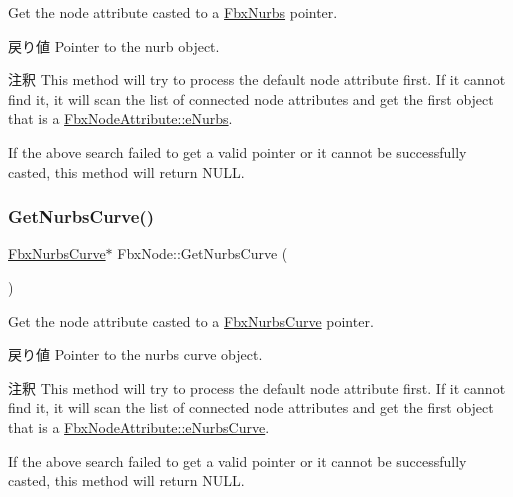 Get the node attribute casted to a \hyperlink{class_fbx_nurbs}{Fbx\+Nurbs} pointer. \begin{DoxyReturn}{戻り値}
Pointer to the nurb object. 
\end{DoxyReturn}
\begin{DoxyRemark}{注釈}
This method will try to process the default node attribute first. If it cannot find it, it will scan the list of connected node attributes and get the first object that is a \hyperlink{class_fbx_node_attribute_a08e1669d3d1a696910756ab17de56d6aa34e416198478e89143c5d2eaf909cecc}{Fbx\+Node\+Attribute\+::e\+Nurbs}. 

If the above search failed to get a valid pointer or it cannot be successfully casted, this method will return {\ttfamily N\+U\+LL}. 
\end{DoxyRemark}
\mbox{\label{class_fbx_node_a5a57feb5e988b184bef84058f53e3184}} 
\subsubsection{\texorpdfstring{Get\+Nurbs\+Curve()}{GetNurbsCurve()}}
{\footnotesize\ttfamily \hyperlink{class_fbx_nurbs_curve}{Fbx\+Nurbs\+Curve}$\ast$ Fbx\+Node\+::\+Get\+Nurbs\+Curve (\begin{DoxyParamCaption}{ }\end{DoxyParamCaption})}

Get the node attribute casted to a \hyperlink{class_fbx_nurbs_curve}{Fbx\+Nurbs\+Curve} pointer. \begin{DoxyReturn}{戻り値}
Pointer to the nurbs curve object. 
\end{DoxyReturn}
\begin{DoxyRemark}{注釈}
This method will try to process the default node attribute first. If it cannot find it, it will scan the list of connected node attributes and get the first object that is a \hyperlink{class_fbx_node_attribute_a08e1669d3d1a696910756ab17de56d6aae7a889cc6d7682817fc718d13048187f}{Fbx\+Node\+Attribute\+::e\+Nurbs\+Curve}. 

If the above search failed to get a valid pointer or it cannot be successfully casted, this method will return {\ttfamily N\+U\+LL}. 
\end{DoxyRemark}
\mbox{\label{class_fbx_node_abddb891023f93474f91e443f2c523d5f}} 
